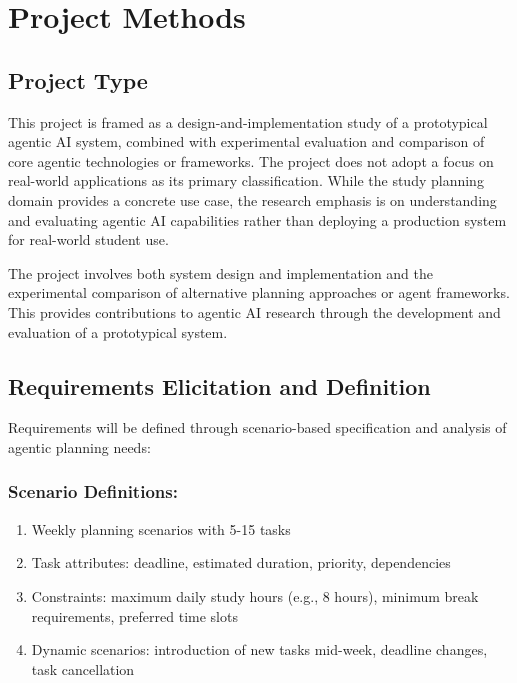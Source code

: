 \documentclass[12pt]{article}
\begin{document}
\section{Project Methods}
\subsection{Project Type}
This project is framed as a design-and-implementation study of a prototypical agentic AI system, combined with experimental evaluation and comparison of core agentic technologies or frameworks. The project does not adopt a focus on real-world applications as its primary classification. While the study planning domain provides a concrete use case, the research emphasis is on understanding and evaluating agentic AI capabilities rather than deploying a production system for real-world student use.

The project involves both system design and implementation and the experimental comparison of alternative planning approaches or agent frameworks. This provides contributions to agentic AI research through the development and evaluation of a prototypical system.

\subsection{Requirements Elicitation and Definition}

Requirements will be defined through scenario-based specification and analysis of agentic planning needs:

\subsubsection{Scenario Definitions:}
\begin{enumerate}
    \item Weekly planning scenarios with 5-15 tasks
    \item Task attributes: deadline, estimated duration, priority, dependencies
    \item Constraints: maximum daily study hours (e.g., 8 hours), minimum break requirements, preferred time slots
    \item Dynamic scenarios: introduction of new tasks mid-week, deadline changes, task cancellation
\end{enumerate}
\end{document}
